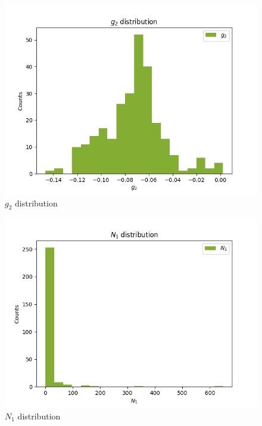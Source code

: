 \documentclass[
]{article}
\begin{document}
\begin{figure}
\centering
\includegraphics{pngplots/param0.png}
\caption{\(g_2\) distribution}
\end{figure}

\begin{figure}
\centering
\includegraphics{pngplots/param1.png}
\caption{\(N_1\) distribution}
\end{figure}
\end{document}
